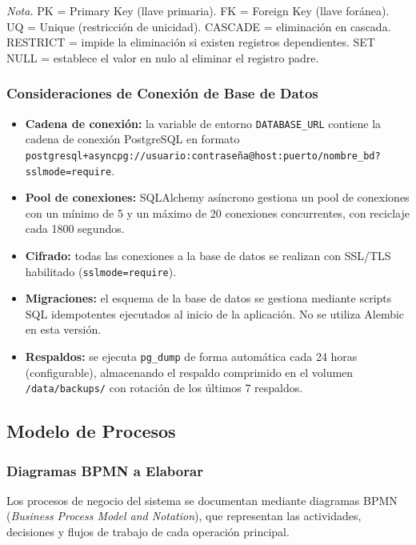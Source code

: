 \textit{Nota.} PK = Primary Key (llave primaria). FK = Foreign Key (llave foránea). UQ = Unique (restricción de unicidad). CASCADE = eliminación en cascada. RESTRICT = impide la eliminación si existen registros dependientes. SET NULL = establece el valor en nulo al eliminar el registro padre.

\subsubsection{Consideraciones de Conexión de Base de Datos}

\begin{itemize}
    \item \textbf{Cadena de conexión:} la variable de entorno \texttt{DATABASE\_URL} contiene la cadena de conexión PostgreSQL en formato \texttt{postgresql+asyncpg://usuario:contraseña@host:puerto/nombre\_bd?sslmode=require}.
    \item \textbf{Pool de conexiones:} SQLAlchemy asíncrono gestiona un pool de conexiones con un mínimo de 5 y un máximo de 20 conexiones concurrentes, con reciclaje cada 1800 segundos.
    \item \textbf{Cifrado:} todas las conexiones a la base de datos se realizan con SSL/TLS habilitado (\texttt{sslmode=require}).
    \item \textbf{Migraciones:} el esquema de la base de datos se gestiona mediante scripts SQL idempotentes ejecutados al inicio de la aplicación. No se utiliza Alembic en esta versión.
    \item \textbf{Respaldos:} se ejecuta \texttt{pg\_dump} de forma automática cada 24 horas (configurable), almacenando el respaldo comprimido en el volumen \texttt{/data/backups/} con rotación de los últimos 7 respaldos.
\end{itemize}

\subsection{Modelo de Procesos}

\subsubsection{Diagramas BPMN a Elaborar}

Los procesos de negocio del sistema se documentan mediante diagramas BPMN (\textit{Business Process Model and Notation}), que representan las actividades, decisiones y flujos de trabajo de cada operación principal.

